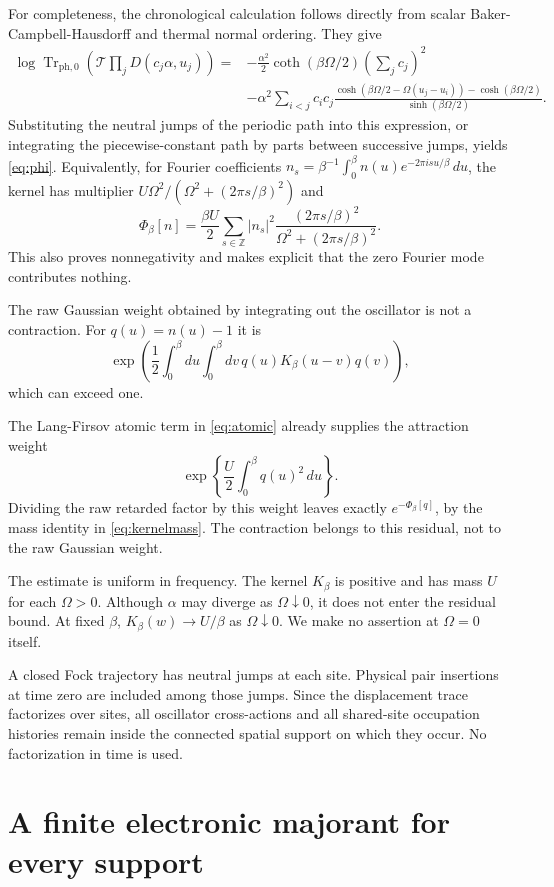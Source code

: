 \documentclass[11pt]{article}
\DeclareMathOperator{\Tr}{Tr}
\newcommand{\Trph}{\Tr_{\mathrm{ph},0}}
\begin{document}
For completeness, the chronological calculation follows directly from scalar Baker-Campbell-Hausdorff and thermal normal ordering. They give
\begin{align}\label{eq:bch}
 \log\Trph\!\left(\mathcal T\prod_jD(c_j\alpha,u_j)\right)
 ={}&-\frac{\alpha^2}{2}\coth(\beta\Omega/2)\left(\sum_jc_j\right)^2\\
 &-\alpha^2\sum_{i<j}c_ic_j
 \frac{\cosh(\beta\Omega/2-\Omega(u_j-u_i))-\cosh(\beta\Omega/2)}
      {\sinh(\beta\Omega/2)}.\nonumber
\end{align}
Substituting the neutral jumps of the periodic path into this expression, or integrating the piecewise-constant path by parts between successive jumps, yields \eqref{eq:phi}. Equivalently, for Fourier coefficients $n_s=\beta^{-1}\int_0^\beta n(u)e^{-2\pi isu/\beta}\,du$, the kernel has multiplier $U\Omega^2/(\Omega^2+(2\pi s/\beta)^2)$ and
\[
 \Phi_\beta[n]=\frac{\beta U}{2}\sum_{s\in\mathbb Z}|n_s|^2
 \frac{(2\pi s/\beta)^2}{\Omega^2+(2\pi s/\beta)^2}.
\]
This also proves nonnegativity and makes explicit that the zero Fourier mode contributes nothing.

The raw Gaussian weight obtained by integrating out the oscillator is not a contraction. For $q(u)=n(u)-1$ it is
\[
 \exp\!\left(\frac12\int_0^\beta\!du\int_0^\beta\!dv\,
       q(u)K_\beta(u-v)q(v)\right),
\]
which can exceed one.

The Lang-Firsov atomic term in \eqref{eq:atomic} already supplies the attraction weight
\[
 \exp\!\left\{\frac U2\int_0^\beta q(u)^2\,du\right\}.
\]
Dividing the raw retarded factor by this weight leaves exactly $e^{-\Phi_\beta[q]}$, by the mass identity in \eqref{eq:kernelmass}. The contraction belongs to this residual, not to the raw Gaussian weight.

The estimate is uniform in frequency. The kernel $K_\beta$ is positive and has mass $U$ for each $\Omega>0$. Although $\alpha$ may diverge as $\Omega\downarrow0$, it does not enter the residual bound. At fixed $\beta$, $K_\beta(w)\to U/\beta$ as $\Omega\downarrow0$. We make no assertion at $\Omega=0$ itself.

A closed Fock trajectory has neutral jumps at each site. Physical pair insertions at time zero are included among those jumps. Since the displacement trace factorizes over sites, all oscillator cross-actions and all shared-site occupation histories remain inside the connected spatial support on which they occur. No factorization in time is used.

\section{A finite electronic majorant for every support}
\end{document}
